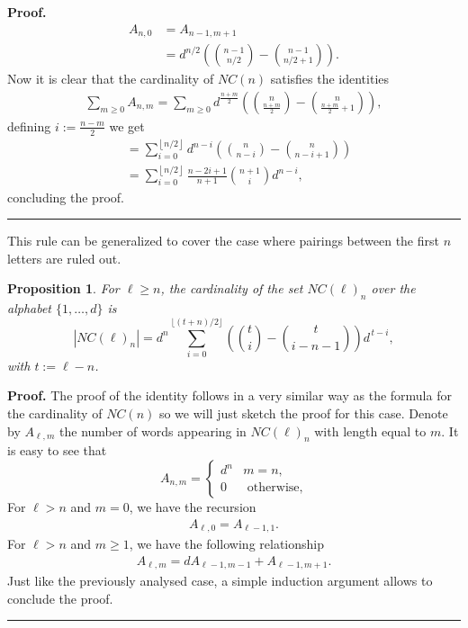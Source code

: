 \documentclass{article}%
\newtheorem{proposition}[theorem]{Proposition}
\newenvironment{proof}[1][Proof]{\noindent\textbf{#1.} }{\ \rule{0.5em}{0.5em}}
\newcommand{\floor}[1]{\left \lfloor {#1}\right \rfloor}
\begin{document}
\begin{proof}
\begin{align*}
    A_{n,0} &=  A_{n-1, m+1} \\
            &=  d^{n/2}\left( \binom{n-1}{n/2} - \binom{n-1}{n/2+1} \right). 
\end{align*}
Now it is clear that the cardinality of $NC(n)$ satisfies the identities 
\begin{align*}
    \sum_{m \geq 0} A_{n,m} = \sum_{m \geq 0} d^{\frac{n+m}{2}} \left( \binom{n}{\frac{n+m}{2}} - \binom{n}{\frac{n+m}{2} + 1}  \right),
\end{align*}
defining $i := \frac{n - m}{2}$ we get
\begin{align*}
    &= \sum_{i=0}^{\floor{n/2}} d^{n-i} \left( \binom{n}{n-i} - \binom{n}{n - i + 1}  \right)\\
    &= \sum_{i = 0}^{\floor{n/2}} \frac{n -2i +1}{n+1} \binom{n+1}{i} d^{n - i},
\end{align*}
concluding the proof.
\end{proof}

This rule can be generalized to cover the case where pairings between the first $n$ letters are ruled out. 

\begin{proposition}\label{identity_cardinality_NC}
For $\ell \geq n$, the cardinality of the set $NC(\ell)_n$ over the alphabet $\{1,\dots,d\}$ is
\[
|NC(\ell)_n|
= d^n \sum_{i=0}^{\lfloor (t+n)/2 \rfloor}
\left( \binom{t}{i} - \binom{t}{i-n-1} \right) d^{\,t-i},
\]
with $t := \ell - n$.
\end{proposition}

\begin{proof}
The proof of the identity follows in a very similar way as the formula for the cardinality of $NC(n)$ so we will just sketch the proof for this case.\newline
Denote by $A_{\ell,m}$ the number of words appearing in $NC(\ell)_n$ with length equal to $m$. It is easy to see that
\[
A_{n, m} = \begin{cases}
d^n & m = n,\\
0 & \text{ otherwise,}
\end{cases}
\]
For $\ell > n$ and $m =0$, we have the recursion 
\begin{align*}
A_{\ell, 0} = A_{\ell-1, 1}.
\end{align*}
For $\ell > n$ and $m \geq 1$, we have the following relationship
\begin{align*}
    A_{\ell, m} = d A_{\ell-1, m-1} + A_{\ell-1, m+1}.
\end{align*}
Just like the previously analysed case, a simple induction argument allows to conclude the proof.
\end{proof}
\end{document}
